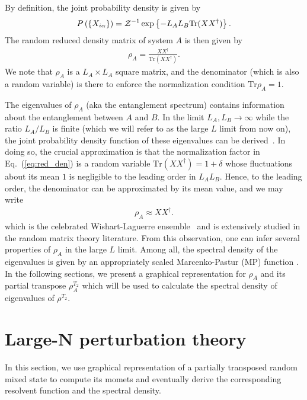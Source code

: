 \documentclass[aps,pra,groupedaddress,onecolumn,notitlepage,superscriptaddress,10pt]{revtex4-1}
\newcommand{\rT}{{\rho^{T_2}} }
\newcommand{\Tr}{\text{Tr}}
\newcommand{\tr}{\text{Tr}}
\begin{document}
By definition, the joint probability density is given by
\begin{align}
    \label{eq:Xprob}
    P\left( \{X_{i\alpha} \} \right) = {\cal Z}^{-1} \exp \left\{- L_A L_B \Tr(XX^\dag) \right\}.
\end{align}
The random reduced density matrix of system $A$ is then given by
\begin{align}
\label{eq:red_den}
\rho_{A}=\frac{XX^{\dag}}{\tr (X X^\dag)}.
\end{align}
We note that $\rho_A$ is a $L_A \times L_A$ square matrix, and  the denominator (which is also a random variable) is there to enforce the normalization condition $\Tr \rho_A=1$.


The eigenvalues of $\rho_A$ (aka the entanglement spectrum) contains information about the entanglement between $A$ and $B$. In the limit $L_A, L_B \to \infty$ while the ratio $L_A/L_B$ is finite (which we will refer to as the large $L$ limit from now on), 
the joint probability density function of these eigenvalues can be derived~\cite{Lloyd1988, Zyczkowski2001}. In doing so, the crucial approximation is that the normalization factor in Eq.~(\ref{eq:red_den}) is a random variable $\Tr (XX^\dag)= 1+ \delta$ whose fluctuations about its mean $1$ is negligible to the leading order in $L_A L_B$. Hence, to the leading order, the denominator can be approximated by its mean value, and we may write
\begin{align}
 \rho_A \approx XX^\dag.
 \label{eq:Wishart}
\end{align}
 which is the celebrated  Wishart-Laguerre ensemble~\cite{Forrester} and is extensively studied in the random matrix theory literature. From this observation, one can infer several properties of $\rho_A$ in the large $L$ limit. Among all, the spectral density of the eigenvalues is given by an appropriately scaled Marcenko-Pastur (MP) function \cite{Forrester}. In the following sections, we present a graphical representation for $\rho_A$ and its partial transpose $\rho_A^{T_2}$ which will be used to calculate the spectral density of eigenvalues of $\rT$.

\section{Large-N perturbation theory}
In this section, we use graphical representation of a partially transposed random mixed state to  compute its momets  and eventually derive the corresponding resolvent function and the spectral density.
\end{document}
